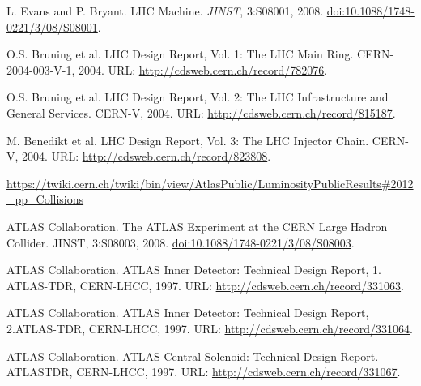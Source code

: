 \begin{thebibliography}{99}
\setlength{\itemsep}{0.3in}

L. Evans and P. Bryant. LHC Machine. \textit{JINST}, 3:S08001, 2008. \href{http://iopscience.iop.org/1748-0221/3/08/S08001/}{doi:10.1088/1748-0221/3/08/S08001}.


O.S. Bruning et al. LHC Design Report, Vol. 1: The LHC Main Ring. CERN-2004-003-V-1, 2004. URL: \href{http://cdsweb.cern.ch/record/782076}{http://cdsweb.cern.ch/record/782076}.

O.S. Bruning et al. LHC Design Report, Vol. 2: The LHC Infrastructure and General Services. CERN\--V, 2004. URL: \url{http://cdsweb.cern.ch/record/815187}.

M. Benedikt et al. LHC Design Report, Vol. 3: The LHC Injector Chain. CERN\--V, 2004. URL: \href{http://cdsweb.cern.ch/record/823808}{http://cdsweb.cern.ch/record/823808}.


\url{https://twiki.cern.ch/twiki/bin/view/AtlasPublic/LuminosityPublicResults#2012_pp_Collisions}


ATLAS Collaboration. The ATLAS Experiment at the CERN Large Hadron Collider. JINST, 3:S08003, 2008. \href{http://dx.doi.org/10.1088/1748-0221/3/08/S08003}{doi:10.1088/1748-0221/3/08/S08003}.

ATLAS Collaboration. ATLAS Inner Detector: Technical Design Report, 1. ATLAS\--TDR, CERN-LHCC, 1997. URL: \url{http://cdsweb.cern.ch/record/331063}.

ATLAS Collaboration. ATLAS Inner Detector: Technical Design Report, 2.ATLAS\--TDR, CERN\--LHCC, 1997. URL: \url{http://cdsweb.cern.ch/record/331064}.

ATLAS Collaboration. ATLAS Central Solenoid: Technical Design Report. ATLASTDR, CERN\--LHCC, 1997. URL: \url{http://cdsweb.cern.ch/record/331067}.


\end{thebibliography}
